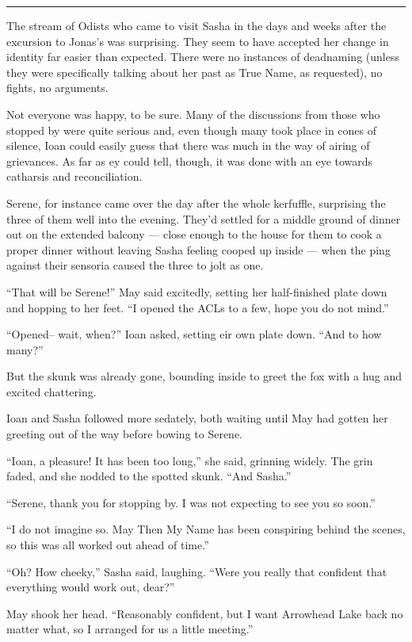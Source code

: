\begin{center}\rule{0.5\linewidth}{0.5pt}\end{center}

The stream of Odists who came to visit Sasha in the days and weeks after the excursion to Jonas's was surprising. They seem to have accepted her change in identity far easier than expected. There were no instances of deadnaming (unless they were specifically talking about her past as True Name, as requested), no fights, no arguments.

Not everyone was happy, to be sure. Many of the discussions from those who stopped by were quite serious and, even though many took place in cones of silence, Ioan could easily guess that there was much in the way of airing of grievances. As far as ey could tell, though, it was done with an eye towards catharsis and reconciliation.

Serene, for instance came over the day after the whole kerfuffle, surprising the three of them well into the evening. They'd settled for a middle ground of dinner out on the extended balcony — close enough to the house for them to cook a proper dinner without leaving Sasha feeling cooped up inside — when the ping against their sensoria caused the three to jolt as one.

``That will be Serene!'' May said excitedly, setting her half-finished plate down and hopping to her feet. ``I opened the ACLs to a few, hope you do not mind.''

``Opened-- wait, when?'' Ioan asked, setting eir own plate down. ``And to how many?''

But the skunk was already gone, bounding inside to greet the fox with a hug and excited chattering.

Ioan and Sasha followed more sedately, both waiting until May had gotten her greeting out of the way before bowing to Serene.

``Ioan, a pleasure! It has been too long,'' she said, grinning widely. The grin faded, and she nodded to the spotted skunk. ``And Sasha.''

``Serene, thank you for stopping by. I was not expecting to see you so soon.''

``I do not imagine so. May Then My Name has been conspiring behind the scenes, so this was all worked out ahead of time.''

``Oh? How cheeky,'' Sasha said, laughing. ``Were you really that confident that everything would work out, dear?''

May shook her head. ``Reasonably confident, but I want Arrowhead Lake back no matter what, so I arranged for us a little meeting.''

